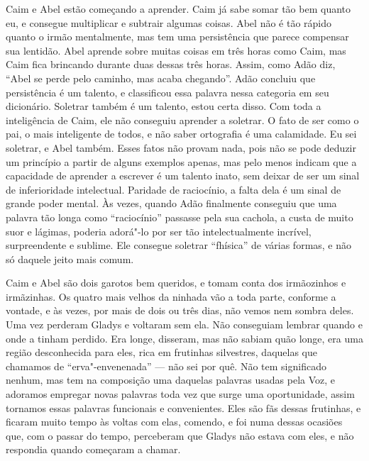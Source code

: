 

Caim e Abel estão começando a aprender. Caim já sabe somar tão bem quanto eu, e
consegue multiplicar e subtrair algumas coisas. Abel não é tão rápido quanto o
irmão mentalmente, mas tem uma persistência que parece compensar sua lentidão. Abel aprende
sobre muitas coisas em três horas como Caim, mas Caim fica brincando durante duas
dessas três horas. Assim, como Adão diz, “Abel se perde pelo caminho,
mas acaba chegando”. Adão concluiu que persistência é um talento, e
classificou essa palavra nessa categoria em seu dicionário. Soletrar também é
um talento, estou certa disso. Com toda a inteligência de Caim, ele não conseguiu
aprender a soletrar. O fato de ser como o pai, o mais inteligente
de todos, e não saber ortografia é uma calamidade. Eu sei soletrar, e Abel
também. Esses fatos não provam nada, pois não se pode deduzir um
princípio a partir de alguns exemplos apenas, mas pelo menos indicam que a capacidade
de aprender a escrever é um talento inato, sem deixar de
ser um sinal de inferioridade intelectual. Paridade de raciocínio, a falta dela é    
um sinal de grande poder mental. Às vezes, quando Adão finalmente conseguiu que uma
palavra tão longa como “raciocínio” passasse pela sua cachola, a custa de muito suor e lágimas, 
poderia adorá"-lo por ser tão intelectualmente incrível, surpreendente e
sublime. Ele consegue soletrar “fhísica” de várias formas, e não só daquele jeito mais comum.

Caim e Abel são dois garotos bem queridos, e tomam conta dos irmãozinhos e
irmãzinhas. Os quatro mais velhos da ninhada vão a toda parte, conforme a vontade, e
às vezes, por mais de dois ou três dias, não vemos nem sombra deles. Uma vez
perderam Gladys e voltaram sem ela. Não conseguiam lembrar
quando e onde a tinham perdido. Era longe, disseram, mas não sabiam quão longe,
era uma região desconhecida para eles, rica em frutinhas
silvestres, daquelas que chamamos de “erva"-envenenada” --- não sei por quê. Não tem
significado nenhum, mas tem na composição uma daquelas palavras usadas pela Voz, e
adoramos empregar novas palavras toda vez que surge uma oportunidade, assim
tornamos essas palavras funcionais e convenientes. Eles são fãs dessas frutinhas,
e ficaram muito tempo às voltas com elas, comendo, e foi numa dessas ocasiões que, com o passar do
tempo, perceberam que Gladys não estava com eles, e não respondia quando
começaram a chamar.

